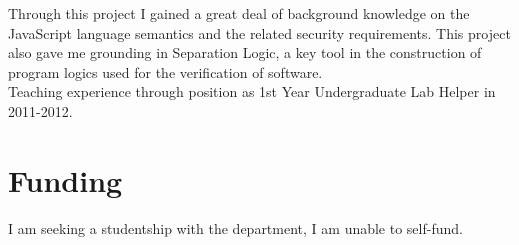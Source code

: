 \documentclass[a4paper]{article}
\begin{document}
Through this project I gained a great deal of background knowledge on the
JavaScript language semantics and the related security requirements. This
project also gave me grounding in Separation Logic, a key tool in
the construction of program logics used for the verification of software.
\\

Teaching experience through position as 1st Year Undergraduate Lab Helper in
2011-2012.

\section{Funding}
I am seeking a studentship with the department, I am unable to self-fund.
\end{document}
